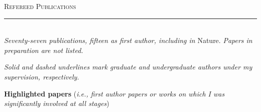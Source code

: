 \documentclass[11pt]{article}
\makeatletter
\def\vhrulefill#1{\leavevmode\leaders\hrule\@height#1\hfill \kern\z@}
\makeatother
\begin{document}



\clearpage

\textsc{Refereed Publications} \vhrulefill{0.4pt}\\


\textit{Seventy-seven publications, fifteen as first author, including in} Nature. \textit{Papers in preparation are not listed.}

\textit{Solid and dashed underlines mark graduate and undergraduate authors under my supervision, respectively.}\\

\vspace{-1mm}

\textbf{Highlighted papers} (\textit{i.e., first author papers or works on which I was significantly involved at all stages})\\

\vspace{-4mm}
\end{document}
